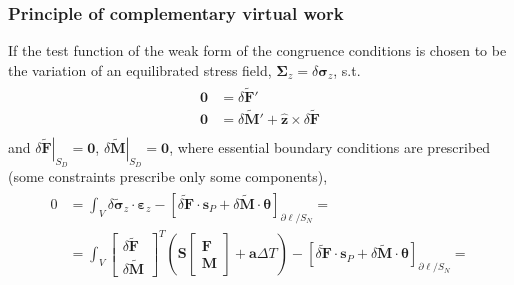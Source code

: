 \documentclass[letterpaper,10pt,english]{jupyterBook}
\begin{document}
\subsubsection{Principle of complementary virtual work}
\label{\detokenize{ch/solids/small-displacements-statics-beams-weak-form-general:principle-of-complementary-virtual-work}}\label{\detokenize{ch/solids/small-displacements-statics-beams-weak-form-general:solid-mechanics-intro-small-displacements-statics-beam-weak-form-weak-pcvw}}
\sphinxAtStartPar
If the test function of the weak form of the congruence conditions is chosen to be the variation of an equilibrated stress field, \(\boldsymbol\Sigma_z = \delta \boldsymbol\sigma_z\), s.t.
\begin{equation*}
\begin{split}\begin{aligned}
  \mathbf{0} & = \delta \widetilde{\mathbf{F}}' \\
  \mathbf{0} & = \delta \widetilde{\mathbf{M}}' + \hat{\mathbf{z}} \times \delta \widetilde{\mathbf{F}} \\
\end{aligned}\end{split}
\end{equation*}
\sphinxAtStartPar
and \(\left.\delta \widetilde{\mathbf{F}}\right|_{S_D} = \mathbf{0}\), \(\left.\delta \widetilde{\mathbf{M}}\right|_{S_D} = \mathbf{0}\), where essential boundary conditions are prescribed (some constraints prescribe only some components),
\begin{equation*}
\begin{split}\begin{aligned}
  0 
  & = \int_{V} \delta \widetilde{\boldsymbol{\sigma}}_z \cdot \boldsymbol\varepsilon_z - \left[ \widetilde{\delta \mathbf{F}} \cdot \mathbf{s}_P + \delta \widetilde{\mathbf{M}} \cdot \boldsymbol\theta \right]_{\partial \ell / S_N}  = \\
  & = \int_V \begin{bmatrix} \delta \widetilde{\mathbf{F}} \\ \delta \widetilde{\mathbf{M}} \end{bmatrix}^T \left( \mathbf{S} \begin{bmatrix} \mathbf{F} \\ \mathbf{M} \end{bmatrix} + \mathbf{a} \Delta T \right) - \left[ \widetilde{\delta \mathbf{F}} \cdot \mathbf{s}_P + \delta \widetilde{\mathbf{M}} \cdot \boldsymbol\theta \right]_{\partial \ell / S_N}  = \\
\end{aligned}\end{split}
\end{equation*}
\end{document}
